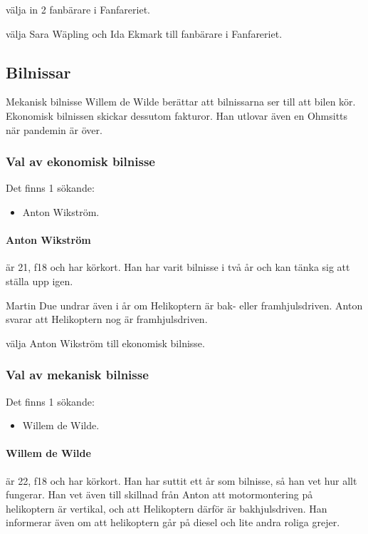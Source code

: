 \documentclass[hidelinks]{sektionsmote}
\begin{document}
\begin{beslut}
  \item välja in 2 fanbärare i Fanfareriet.
  \item välja Sara Wäpling och Ida Ekmark till fanbärare i Fanfareriet.
\end{beslut}


\subsection{Bilnissar}
Mekanisk bilnisse Willem de Wilde berättar att bilnissarna ser till att bilen kör.
Ekonomisk bilnissen skickar dessutom fakturor.
Han utlovar även en Ohmsitts när pandemin är över.


\subsubsection{Val av ekonomisk bilnisse}
Det finns 1 sökande:
\begin{itemize}
    \item Anton Wikström.
\end{itemize}

\paragraph{Anton Wikström} är 21, f18 och har körkort.
Han har varit bilnisse i två år och kan tänka sig att ställa upp igen.

Martin Due undrar även i år om Helikoptern är bak- eller framhjulsdriven.
Anton svarar att Helikoptern nog är framhjulsdriven.

\begin{beslut}
  \item välja Anton Wikström till ekonomisk bilnisse.
\end{beslut}


\subsubsection{Val av mekanisk bilnisse}
Det finns 1 sökande:
\begin{itemize}
    \item Willem de Wilde.
\end{itemize}

\paragraph{Willem de Wilde} är 22, f18 och har körkort.
Han har suttit ett år som bilnisse, så han vet hur allt fungerar.
Han vet även till skillnad från Anton att motormontering på helikoptern är vertikal, och att Helikoptern därför är bakhjulsdriven.
Han informerar även om att helikoptern går på diesel och lite andra roliga grejer.
\end{document}
